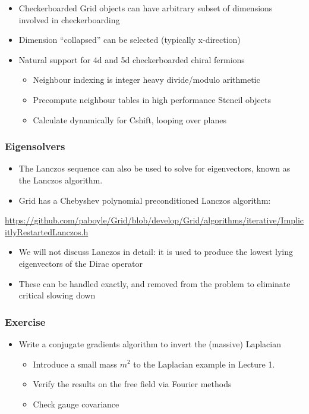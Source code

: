 \documentclass[pdf,ps,8pt]{beamer}
\newcommand{\link}[1]{\href{#1}{ {\color{blue} #1} }}
\begin{document}
\begin{frame}[fragile]
\begin{center}
\end{center}
\begin{itemize}
\item Checkerboarded Grid objects can have arbitrary subset of dimensions involved in checkerboarding
\item Dimension ``collapsed'' can be selected (typically x-direction)
\item Natural support for 4d and 5d checkerboarded chiral fermions  
\begin{itemize}
  \item Neighbour indexing is integer heavy divide/modulo arithmetic
  \item Precompute neighbour tables in high performance Stencil objects
  \item Calculate dynamically for Cshift, looping over planes
\end{itemize}
\end{itemize}
\end{frame}

  \begin{frame}[fragile]\small\frametitle{ Eigensolvers}
\begin{itemize}
\item   The Lanczos sequence can also be used to solve for eigenvectors, known as the Lanczos algorithm.
\item   Grid has a Chebyshev polynomial preconditioned Lanczos algorithm:
\end{itemize}
\link{https://github.com/paboyle/Grid/blob/develop/Grid/algorithms/iterative/ImplicitlyRestartedLanczos.h}
\begin{itemize}
\item We will not discuss Lanczos in detail: it is used to produce the lowest lying eigenvectors of the Dirac operator
\item These can be handled exactly, and removed from the problem to eliminate critical slowing down
\end{itemize}
  \end{frame}


\begin{frame}[fragile]\small\frametitle{ Exercise}

\begin{itemize}
\item Write a conjugate gradients algorithm to invert the (massive) Laplacian
\begin{itemize}
\item Introduce a small mass $m^2$ to the Laplacian example in Lecture 1.
\item Verify the results on the free field via Fourier methods
\item Check gauge covariance
\end{itemize}
\end{itemize}

\end{frame}
\end{document}
